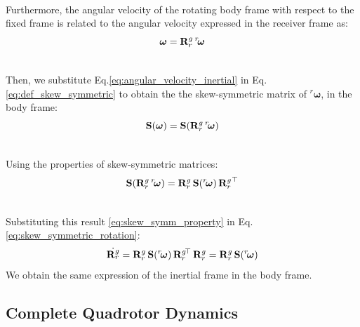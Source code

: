 \documentclass[main]{subfiles}
\begin{document}
\noindent\\
Furthermore, the angular velocity of the rotating body frame with respect to the fixed frame is related to the angular velocity
expressed in the receiver frame as:
\begin{equation}
 \boldsymbol{\omega} = \mathbf{R}^g_r \, {}^r\mkern-3mu\boldsymbol{\omega}
    \label{eq:angular_velocity_inertial}
\end{equation}

\noindent\\
Then, we substitute Eq.\ref{eq:angular_velocity_inertial} in Eq.\ref{eq:def_skew_symmetric} to obtain the 
the skew-symmetric matrix of ${}^r \boldsymbol{\omega}$, in the body frame:
\begin{equation}
 \mathbf{S}(\boldsymbol{\omega}) =  \mathbf{S}(\mathbf{R}^g_r \, {}^r\mkern-3mu\boldsymbol{\omega}) 
    \label{eq:S_body}
\end{equation}

\noindent\\
Using the properties of skew-symmetric matrices:
\begin{equation}
 \mathbf{S}(\mathbf{R}^g_r \, {}^r\mkern-3mu\boldsymbol{\omega}) = \mathbf{R}^g_r \, \mathbf{S}({}^r\mkern-3mu\boldsymbol{\omega}) \, {\mathbf{R}^g_r}^\top 
    \label{eq:skew_symm_property}
\end{equation}

\noindent\\
Substituting this result \eqref{eq:skew_symm_property} in Eq.\ref{eq:skew_symmetric_rotation}:
\begin{equation}
 \dot{\mathbf{R}^g_r} = \mathbf{R}^g_r \, \mathbf{S}({}^r\mkern-3mu\boldsymbol{\omega}) \, {\mathbf{R}^g_r}\mkern-3mu^\top  \, \mathbf{R}^g_r = \mathbf{R}^g_r \, \mathbf{S}({}^r\mkern-3mu\boldsymbol{\omega})
    \label{eq:skew_symmetric_body}
\end{equation}
We obtain the same expression of the inertial frame in the body frame.

\subsection{Complete Quadrotor Dynamics}
\end{document}
